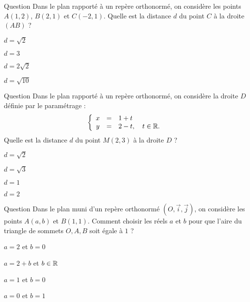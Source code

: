 \begin{multi}[multiple,feedback=
{Utiliser la formule \(\displaystyle d=\frac{\left|\mbox{det}\left(\overrightarrow{AC},\overrightarrow{AB}\right)\right|}{\|\overrightarrow{AB}\|}=2\sqrt{2}\).
}]{Question}
Dans le plan rapporté à un repère orthonormé, on considère les points \(\displaystyle A(1,2)\), \(B(2,1)\) et \(C(-2,1)\). Quelle est la distance \(d\) du point \(C\) à la droite \((AB)\) ?

    \item \(d=\sqrt{2}\)
    \item \(d=3\)
    \item* \(d=2\sqrt{2}\)
    \item \(d=\sqrt{10}\)
\end{multi}


\begin{multi}[multiple,feedback=
{Le point \(A(1,2)\in D\) et le vecteur \(\vec{v}=(1,-1)\) dirige \(D\). On utilise la formule \(\displaystyle d=\frac{\left|\mbox{det}\left(\overrightarrow{AM},\vec{v}\right)\right|}{\|\vec{v}\|}=\sqrt{2}\).
}]{Question}
Dans le plan rapporté à un repère orthonormé, on considère la droite \(D\) d\'efinie par le paramétrage :
\[\left\{\begin{array}{ccl}x&=&1+t\\ y&=&2-t,\quad t\in \mathbb{R}.
\end{array}\right.\]
Quelle est la distance \(d\) du point \(M(2,3)\) à la droite \(D\) ?

    \item* \(d=\sqrt{2}\)
    \item \(d=\sqrt{3}\)
    \item \(d=1\)
    \item \(d=2\)
\end{multi}


\begin{multi}[multiple,feedback=
{On doit avoir \(\displaystyle 2\mbox{Aire}(OAB)=\left|\mbox{det}\left(\overrightarrow{OA},\overrightarrow{AB}\right)\right|=2\). Ceci donne (\(a=2+b\) et \(b\in \Rr\)).
}]{Question}
Dans le plan muni d'un repère orthonormé \((O,\vec{i},\vec{j})\), on considère les points \(\displaystyle A(a,b)\) et \(\displaystyle B(1,1)\). Comment choisir les réels \(a\) et \(b\) pour que l'aire du triangle de sommets \(O,A,B\) soit égale à \(1\) ?

    \item* \(\displaystyle a=2\) et \(\displaystyle b=0\)
    \item* \(\displaystyle a=2+b\) et \(\displaystyle b\in \mathbb{R}\)
    \item \(\displaystyle a=1\) et \(\displaystyle b=0\)
    \item \(\displaystyle a=0\) et \(\displaystyle b=1\)
\end{multi}


